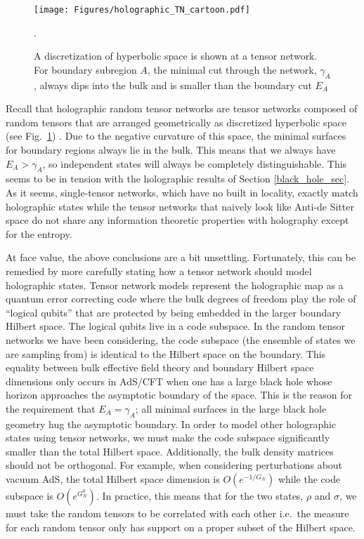 \documentclass[a4paper,11pt]{article}
\newcommand*{\SR}[1]{\textcolor{magenta}{[SR: \textsf{#1}]}}
\begin{document}
\begin{figure}
    \centering
    \texttt{[image: Figures/holographic\_TN\_cartoon.pdf]}
    \caption{A discretization of hyperbolic space is shown at a tensor network. For boundary subregion $A$, the minimal cut through the network, $\gamma_A$, always dips into the bulk and is smaller than the boundary cut $E_A$}.
    \label{holographic_TN_cartoon}
\end{figure}

Recall that holographic random tensor networks are tensor networks composed of random tensors that are arranged geometrically as discretized hyperbolic space (see Fig.~\ref{holographic_TN_cartoon}) \cite{2016JHEP...11..009H}. Due to the negative curvature of this space, the minimal surfaces for boundary regions always lie in the bulk. This means that we always have $E_A > \gamma_A$, so independent states will always be completely distinguishable. This seems to be in tension with the holographic results of Section \ref{black_hole_sec}. As it seems, single-tensor networks, which have no built in locality, exactly match holographic states while the tensor networks that naively look like Anti-de Sitter space do not share any information theoretic properties with holography except for the entropy. 



At face value, the above conclusions are a bit unsettling. Fortunately, this can be remedied by more carefully stating how a tensor network should model holographic states. Tensor network models represent the holographic map as a quantum error correcting code where the bulk degrees of freedom play the role of ``logical qubits'' that are protected by being embedded in the larger boundary Hilbert space. The logical qubits live in a code subspace. In the random tensor networks we have been considering, the code subspace (the ensemble of states we are sampling from) is identical to the Hilbert space 
on the boundary. This equality between bulk effective field theory and boundary Hilbert space dimensions only occurs in AdS/CFT when one has a large black hole whose horizon approaches the asymptotic boundary of the space. This is the reason for the requirement that $E_A = \gamma_A$; all minimal surfaces in the large black hole geometry hug the asymptotic boundary. In order to model other holographic states using tensor networks, we must make the code subspace significantly smaller than the total Hilbert space. Additionally, the bulk density matrices should not be orthogonal. For example, when considering perturbations about vacuum AdS, the total Hilbert space dimension is $O(e^{-1/G_N})$ while the code subspace is $O(e^{G_N^{0}})$. In practice, this means that for the two states, $\rho$ and $\sigma$, we must take the random tensors to be correlated with each other i.e.~the measure for each random tensor only has support on a proper subset of the Hilbert space.
\end{document}

